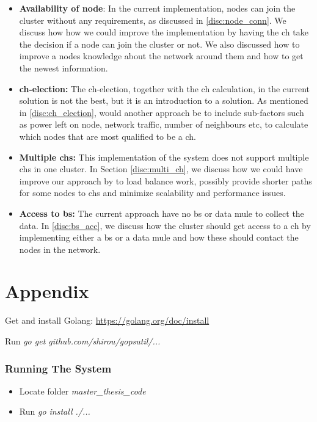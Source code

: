 \documentclass[USenglish]{uit-thesis}
\begin{document}
\begin{itemize}
\item \textbf{Availability of node}: In the current implementation, nodes can join the cluster without any requirements, as discussed in \autoref{disc:node_conn}. We discuss how  how we could improve the implementation by having the \gls{ch} take the decision if a node can join the cluster or not. We also discussed how to improve a nodes knowledge about the network around them and how to get the newest information.

\item \textbf{\gls{ch}-election:} The \gls{ch}-election, together with the \gls{ch} calculation, in the current solution is not the best, but it is an introduction to a solution. As mentioned in \autoref{disc:ch_election}, would another approach be to include sub-factors such as power left on node, network traffic, number of neighbours etc, to calculate which nodes that are most qualified to be a \gls{ch}. 

\item \textbf{Multiple \glspl{ch}:} This implementation of the system does not support multiple \glspl{ch} in one cluster. In Section \autoref{disc:multi_ch}, we discuss how we could have improve our approach by to load balance work, possibly provide shorter paths for some nodes to \glspl{ch} and minimize scalability and performance issues.

\item \textbf{Access to \gls{bs}:} The current approach have no \gls{bs} or data mule to collect the data. In \autoref{disc:bs_acc}, we discuss how the cluster should get access to a \gls{ch} by implementing either a \gls{bs} or a data mule and how these should contact the nodes in the network.

\end{itemize}



\chapter{Appendix}
\glsresetall
Get and install Golang: \url{https://golang.org/doc/install}

Run \textit{go get github.com/shirou/gopsutil/...}

\subsection{Running The System}
\begin{itemize}
\item Locate folder \textit{master\_thesis\_code}
\item Run \textit{go install ./...}
\end{itemize}
\end{document}
